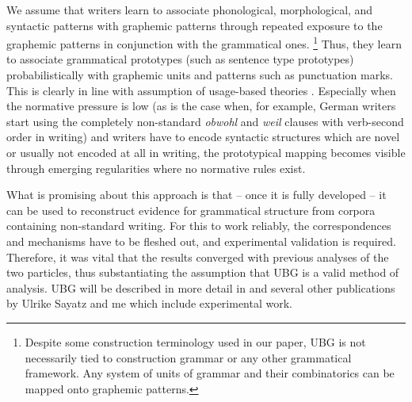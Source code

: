 We assume that writers learn to associate phonological, morphological, and syntactic patterns with graphemic patterns through repeated exposure to the graphemic patterns in conjunction with the grammatical ones.%
\footnote{Despite some construction terminology used in our paper, UBG is not necessarily tied to construction grammar or any other grammatical framework.
Any system of units of grammar and their combinatorics can be mapped onto graphemic patterns.}
Thus, they learn to associate grammatical prototypes (such as sentence type prototypes) probabilistically with graphemic units and patterns such as punctuation marks.
This is clearly in line with assumption of usage-based theories \citep{BybeeBeckner2009}.
Especially when the normative pressure is low (as is the case when, for example, German writers start using the completely non-standard \textit{obwohl} and \textit{weil} clauses with verb-second order in writing) and writers have to encode syntactic structures which are novel or usually not encoded at all in writing, the prototypical mapping becomes visible through emerging regularities where no normative rules exist.

What is promising about this approach is that -- once it is fully developed -- it can be used to reconstruct evidence for grammatical structure from corpora containing non-standard writing.
For this to work reliably, the correspondences and mechanisms have to be fleshed out, and experimental validation is required.
Therefore, it was vital that the results converged with previous analyses of the two particles, thus substantiating the assumption that UBG is a valid method of analysis.
UBG will be described in more detail in \citet{SchaeferSayatz2019} and several other publications by Ulrike Sayatz and me which include experimental work.
